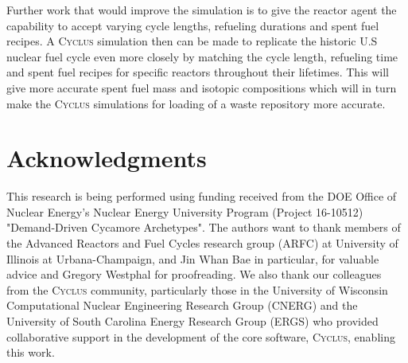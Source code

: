 \documentclass{anstrans}
\newcommand{\Cyclus}{\textsc{Cyclus}\xspace}%
\begin{document}
Further work that would improve the simulation is to give the reactor agent the 
capability to accept varying cycle lengths, refueling durations and spent fuel 
recipes. A \Cyclus simulation then can be made to replicate the historic U.S 
nuclear fuel cycle even more closely by matching the cycle length, refueling 
time and spent fuel recipes for specific reactors throughout their lifetimes. 
This will give more accurate spent fuel mass and isotopic compositions which 
will in turn make the \Cyclus simulations for loading of a waste repository 
more accurate. 

\section{Acknowledgments}
This research is being performed using funding received from the DOE Office of 
Nuclear Energy's Nuclear Energy University Program (Project 16-10512) 
"Demand-Driven Cycamore Archetypes". The authors want to thank members of the 
Advanced Reactors and Fuel Cycles research group (ARFC) at University of 
Illinois at Urbana-Champaign, and Jin Whan Bae in particular, for valuable advice and 
Gregory Westphal for proofreading. We also thank our colleagues from the 
\Cyclus community, particularly those in the University of Wisconsin 
Computational Nuclear Engineering Research Group (CNERG) and the University of 
South Carolina Energy Research Group (ERGS) who provided collaborative support 
in the development of the core software, \Cyclus, enabling this work. 



\end{document}
